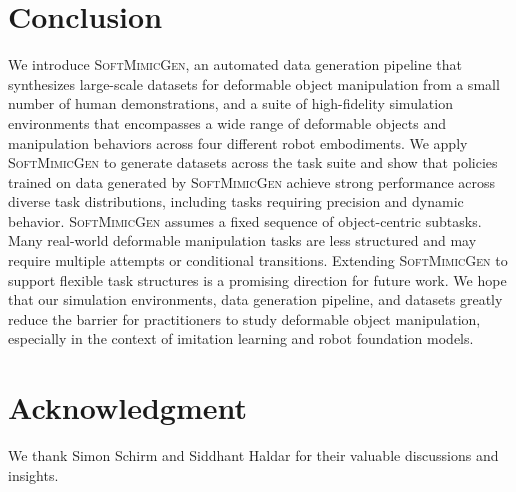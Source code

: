 \documentclass[letterpaper, 10 pt, conference]{ieeeconf}  %
\newcommand{\sysName}{\textsc{SoftMimicGen}\xspace}
\begin{document}
\section{Conclusion}


We introduce \sysName, an automated data generation pipeline that synthesizes large-scale datasets for deformable object manipulation from a small number of human demonstrations, and a suite of high-fidelity simulation environments that encompasses a wide range of deformable objects and manipulation behaviors across four different robot embodiments. We apply \sysName to generate datasets across the task suite and show that policies trained on data generated by \sysName achieve strong performance across diverse task distributions, including tasks requiring precision and dynamic behavior. \sysName assumes a fixed sequence of object-centric subtasks. Many real-world deformable manipulation tasks are less structured and may require multiple attempts or conditional transitions. Extending \sysName to support flexible task structures is a promising direction for future work. We hope that our simulation environments, data generation pipeline, and datasets greatly reduce the barrier for practitioners to study deformable object manipulation, especially in the context of imitation learning and robot foundation models.



\vspace{-5pt}

\section*{Acknowledgment}


We thank Simon Schirm and Siddhant Haldar for their valuable discussions and insights.


\vspace{-5pt}



\end{document}
